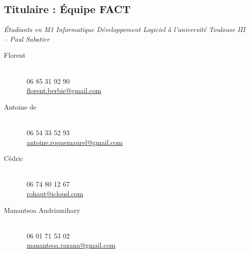	\subsection{Titulaire : Équipe FACT}
	\textit{Étudiants en M1 Informatique Développement Logiciel à l'université Toulouse III -- Paul Sabatier}
	\begin{description}
		\item[Florent ]~ \\
	\Telefon~06 85 31 92 90 \\
	\Letter~\href{mailto:florent.berbie@gmail.com}{florent.berbie@gmail.com} \\
	
\item[Antoine de ] ~\\
	\Telefon~06 54 33 52 93\\
	\Letter~\href{mailto:antoine.roquemaurel@gmail.com}{antoine.roquemaurel@gmail.com} \\
	
\item[Cédric ]~\\ 
	\Telefon~06 74 80 12 67\\
	\Letter~\href{mailto:rohaut@icloud.com}{rohaut@icloud.com} \\
	
\item[Manantsoa Andriamihary ] ~\\
	\Telefon~06 01 71 53 02\\
	\Letter~\href{mailto:manantsoa.razana@gmail.com}{manantsoa.razana@gmail.com}
\end{description}

